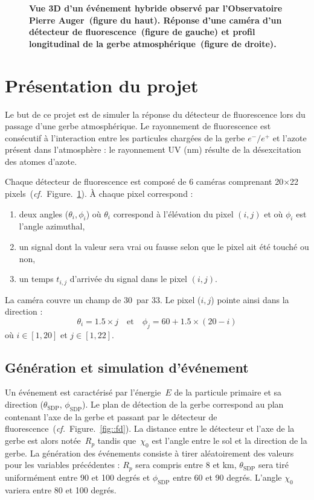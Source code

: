 \documentclass[10pt,a4paper,twoside]{report}
\newcommand{\fig}[1]{Figure.~\ref{#1}}
\begin{document}
\begin{figure}
\begin{tabular}{cc}
  \end{tabular}
  \caption{\textbf{\label{fig::rec}Vue 3D d'un événement hybride observé par
      l'Observatoire Pierre Auger~(figure du haut). Réponse d'une
      caméra d'un détecteur de fluorescence~(figure de gauche) et
      profil longitudinal de la gerbe atmosphérique~(figure de droite).}}
\end{figure}

\section{Présentation du projet}

Le but de ce projet est de simuler la réponse du détecteur de
fluorescence lors du passage d'une gerbe atmosphérique. Le rayonnement
de fluorescence est consécutif à l'interaction entre les particules
chargées de la gerbe $e^-/e^+$ et l'azote présent dans
l'atmosphère : le rayonnement UV (\unit[300-400]{nm}) résulte de la
désexcitation des atomes d'azote.

Chaque détecteur de fluorescence est composé de 6 caméras comprenant
20$\times$22 pixels~(\emph{cf.}~\fig{fig::rec}). \`A chaque pixel
correspond :

\begin{enumerate}

\item[\textbullet] deux angles ($\theta_i, \phi_i$) où $\theta_i$
  correspond à l'élévation du pixel $(i,j)$ et où $\phi_i$ est l'angle
  azimuthal,
\item[\textbullet] un signal dont la valeur sera vrai ou fausse selon
  que le pixel ait été touché ou non,
\item[\textbullet] un temps $t_{i,j}$ d'arrivée du signal dans le pixel
  $(i,j)$.

\end{enumerate}

La caméra couvre un champ de 30\textdegree~par 33\textdegree. Le
pixel ($i,j$) pointe ainsi dans la direction :
\begin{equation*}
\theta_i=1.5\times j \quad \text{et} \quad \phi_j=60 + 1.5\times(20-i)
\end{equation*}
où $i\in[1,20]$ et $j\in[1,22]$.

\subsection{Génération et simulation d'événement}

Un événement est caractérisé par l'énergie~$E$ de la particule
primaire et sa direction ($\theta_\text{SDP}$, $\phi_\text{SDP}$). Le
plan de détection de la gerbe correspond au plan contenant l'axe de la
gerbe et passant par le détecteur de
fluorescence~(\emph{cf.}~\fig{fig::fd}). La distance entre le
détecteur et l'axe de la gerbe est alors notée~$R_p$ tandis
que~$\chi_0$ est l'angle entre le sol et la direction de la gerbe. La
génération des événements consiste à tirer aléatoirement des valeurs
pour les variables précédentes : $R_p$ sera compris entre 8 et
\unit[12]{km}, $\theta_\text{SDP}$ sera tiré uniformément entre 90 et
100 degrés et $\phi_\text{SDP}$ entre 60 et 90 degrés. L'angle
$\chi_0$ variera entre 80 et 100 degrés.
\end{document}
